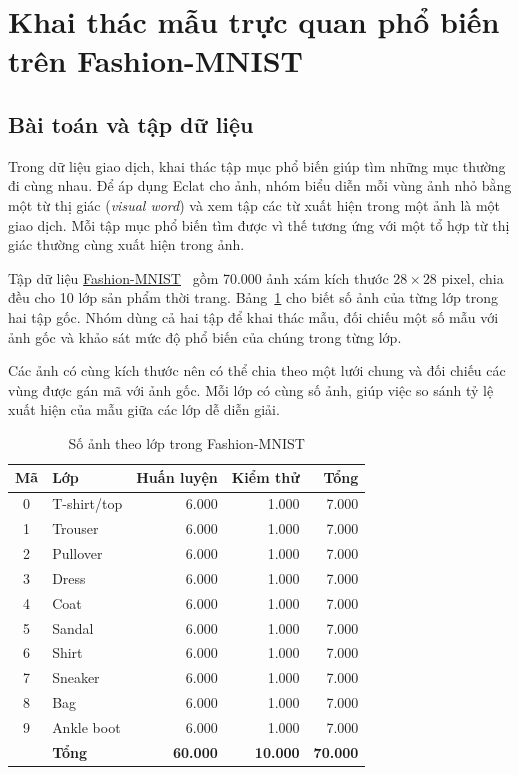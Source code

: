 \section{Khai thác mẫu trực quan phổ biến trên Fashion-MNIST}

\subsection{Bài toán và tập dữ liệu}

Trong dữ liệu giao dịch, khai thác tập mục phổ biến giúp tìm những mục thường đi cùng nhau. Để áp dụng Eclat cho ảnh, nhóm biểu diễn mỗi vùng ảnh nhỏ bằng một từ thị giác (\textit{visual word}) và xem tập các từ xuất hiện trong một ảnh là một giao dịch. Mỗi tập mục phổ biến tìm được vì thế tương ứng với một tổ hợp từ thị giác thường cùng xuất hiện trong ảnh.

Tập dữ liệu \href{https://github.com/zalandoresearch/fashion-mnist}{Fashion-MNIST}~\cite{Xiao2017} gồm 70.000 ảnh xám kích thước $28 \times 28$ pixel, chia đều cho 10 lớp sản phẩm thời trang. Bảng~\ref{tab:fashionmnist_distribution} cho biết số ảnh của từng lớp trong hai tập gốc. Nhóm dùng cả hai tập để khai thác mẫu, đối chiếu một số mẫu với ảnh gốc và khảo sát mức độ phổ biến của chúng trong từng lớp.

Các ảnh có cùng kích thước nên có thể chia theo một lưới chung và đối chiếu các vùng được gán mã với ảnh gốc. Mỗi lớp có cùng số ảnh, giúp việc so sánh tỷ lệ xuất hiện của mẫu giữa các lớp dễ diễn giải.

\begin{table}[!t]
    \centering
    \caption{Số ảnh theo lớp trong Fashion-MNIST}
    \label{tab:fashionmnist_distribution}
    \footnotesize
    \setlength{\tabcolsep}{3pt}
    \begin{tabular}{@{}c l r r r@{}}
        \hline
        \textbf{Mã} & \textbf{Lớp} & \textbf{Huấn luyện} &
        \textbf{Kiểm thử} & \textbf{Tổng} \\
        \hline
        0 & T-shirt/top  & 6.000 & 1.000 & 7.000 \\
        1 & Trouser      & 6.000 & 1.000 & 7.000 \\
        2 & Pullover     & 6.000 & 1.000 & 7.000 \\
        3 & Dress        & 6.000 & 1.000 & 7.000 \\
        4 & Coat         & 6.000 & 1.000 & 7.000 \\
        5 & Sandal       & 6.000 & 1.000 & 7.000 \\
        6 & Shirt        & 6.000 & 1.000 & 7.000 \\
        7 & Sneaker      & 6.000 & 1.000 & 7.000 \\
        8 & Bag          & 6.000 & 1.000 & 7.000 \\
        9 & Ankle boot   & 6.000 & 1.000 & 7.000 \\
        \hline
          & \textbf{Tổng} & \textbf{60.000} & \textbf{10.000} & \textbf{70.000} \\
        \hline
    \end{tabular}
\end{table}

